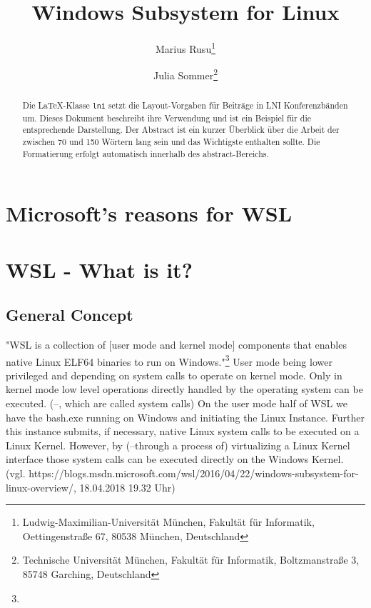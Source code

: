 \documentclass[utf8,biblatex]{lni}
\begin{document}
\title[Ein Kurztitel]{Windows Subsystem for Linux}
\author[Marius Rusu \and Julia Sommer]
{Marius Rusu\footnote{Ludwig-Maximilian-Universität München, Fakultät für Informatik, Oettingenstraße 67, 80538 München, Deutschland } \and
 Julia Sommer\footnote{Technische Universität München, Fakultät für Informatik, Boltzmanstraße 3, 85748 Garching, Deutschland }}
\maketitle

\begin{abstract}
Die \LaTeX-Klasse \texttt{lni} setzt die Layout-Vorgaben für Beiträge in LNI Konferenzbänden um.
Dieses Dokument beschreibt ihre Verwendung und ist ein Beispiel für die entsprechende Darstellung.
Der Abstract ist ein kurzer Überblick über die Arbeit der zwischen 70 und 150 Wörtern lang sein und das Wichtigste enthalten sollte.
Die Formatierung erfolgt automatisch innerhalb des abstract-Bereichs.
\end{abstract}

\section{Microsoft's reasons for WSL}
\section{WSL - What is it?}


\subsection{General Concept}
"WSL is a collection of [user mode and kernel mode] components that enables native Linux ELF64 binaries to run on Windows."\footnote{} User mode being lower privileged and depending on system calls to operate on kernel mode. Only in kernel mode low level operations directly handled by the operating system can be executed. (--, which are called system calls) On the user mode half of WSL we have the bash.exe running on Windows and initiating the Linux Instance. Further this instance submits, if necessary, native Linux system calls to be executed on a Linux Kernel. However, by (--through a process of) virtualizing a Linux Kernel interface those system calls can be executed directly on the Windows Kernel. (vgl. https://blogs.msdn.microsoft.com/wsl/2016/04/22/windows-subsystem-for-linux-overview/, 18.04.2018 19.32 Uhr) 
\end{document}
